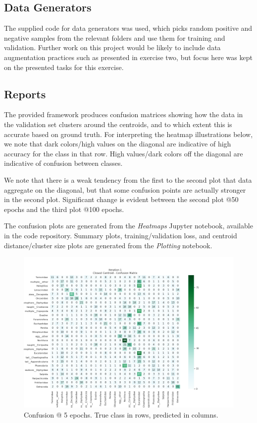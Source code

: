 \documentclass[10pt]{article}
\begin{document}
\subsection{Data Generators}
The supplied code for data generators was used, which picks random positive and negative samples from the relevant folders and use them for training and validation. Further work on this project would be likely to include data augmentation practices such as presented in exercise two, but focus here was kept on the presented tasks for this exercise.

\subsection{Reports}
The provided framework produces confusion matrices showing how the data in the validation set clusters around the centroids, and to which extent this is accurate based on ground truth. For interpreting the heatmap illustrations below, we note that dark colors/high values on the diagonal are indicative of high accuracy for the class in that row. High values/dark colors off the diagonal are indicative of confusion between classes.

We note that there is a weak tendency from the first to the second plot that data aggregate on the diagonal, but that some confusion points are actually stronger in the second plot. Significant change is evident between the second plot @50 epochs and the third plot @100 epochs.

The confusion plots are generated from the \emph{Heatmaps} Jupyter notebook, available in the code repository. Summary plots, training/validation loss, and centroid distance/cluster size plots are generated from the \emph{Plotting} notebook.

\begin{figure}
\includegraphics[scale=.5]{val_confusion_1.png}
\caption{Confusion @ 5 epochs. True class in rows, predicted in columns.}
\end{figure}
\end{document}
